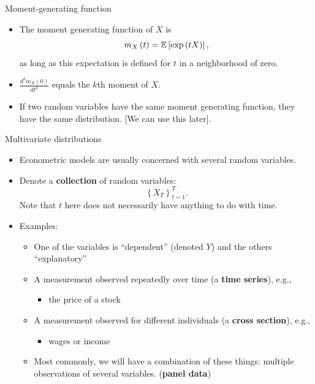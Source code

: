 \begin{frame}{Moment-generating function}
\begin{itemize}
	\item The moment generating function of $X$ is \[
		m_X \left(t\right) = \mathbb{E}\left[\exp\left(tX\right)\right],
	\]	
	as long as this expectation is defined for $t$ in a neighborhood of zero. 
	
	\medskip 
	\item $\frac{d^k m_X \left(0\right) }{dt^k}$ equals the $k$th moment of $X$.

	\medskip
	\item If two random variables have the same moment generating function, they have the same distribution. [We can use this later].
\end{itemize}
\end{frame}



\begin{frame}{Multivariate distributions}
\begin{itemize}
	\item Econometric models are usually concerned with several random variables.

	\item Denote a {\bf collection} of random variables:\[
		\left\{ X_T\right\}_{t=1}^{T}.
	\]
	Note that $t$ here does not necessarily have anything to do with time.

	\item Examples:
	\begin{itemize}
		\item One of the variables  is ``dependent'' (denoted $Y$) and the others ``explanatory''

		\item A measurement observed repeatedly over time (a {\bf time series}), e.g.,
		\begin{itemize}
			\item the price of a stock
		\end{itemize}

		\item A measurement observed for different individuals (a {\bf cross section}), e.g.,
		\begin{itemize}
			\item wages or income
		\end{itemize}
		\item Most commonly, we will have a combination of these things: multiple observations of several variables. ({\bf panel data})
	\end{itemize}
\end{itemize}
\end{frame}



